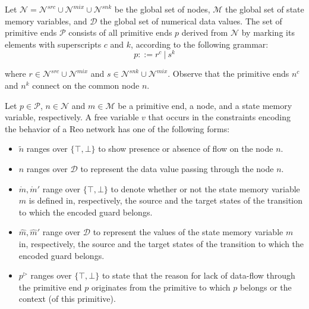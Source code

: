 Let $\mathcal{N} = \mathcal{N}^{src} \cup \mathcal{N}^{mix} \cup \mathcal{N}^{snk}$ be the global set of nodes, $\mathcal{M}$ the global set of state memory variables, and $\mathcal{D}$ the global set of numerical data values. The set of primitive ends $\mathcal{P}$ consists of all primitive ends $p$ derived from $\mathcal{N}$ by marking its elements with superscripts $c$ and $k$, according to the following grammar:
$$
p ::= r^c ~|~ s^k 
$$

\noindent
where $r \in \mathcal{N}^{src} \cup \mathcal{N}^{mix}$ and $s \in \mathcal{N}^{snk} \cup \mathcal{N}^{mix}$. Observe that the primitive ends $n^c$ and $n^k$ connect on the common node $n$.

Let $p \in \mathcal{P}$, $n \in \mathcal{N}$ and $m \in \mathcal{M}$ be a primitive end, a node, and a state memory variable, respectively. A free variable $v$ that occurs in the constraints encoding the behavior of a Reo network has one of the following forms:
\begin{itemize}
 \item $\tilde{n}$ ranges over $\{ \top, \bot \}$ to show presence or absence of flow on the node $n$.
 \item $\hat{n}$ ranges over $\mathcal{D}$ to represent the data value passing through the node $n$.
 \item $\mathring{m}, \mathring{m}'$ range over $\{ \top, \bot \}$ to denote whether or not the state memory variable $m$ is defined in, respectively, the source and the target states of the transition to which the encoded guard belongs.
 \item $\hat{m}, \hat{m}'$ range over $\mathcal{D}$ to represent the values of the state memory variable $m$ in, respectively, the source and the target states of the transition to which the encoded guard belongs.
 \item $p^\triangleright$ ranges over $\{ \top, \bot \}$ to state that the reason for lack of data-flow through the primitive end $p$ originates from the primitive to which $p$ belongs or the context (of this primitive). %
\end{itemize}

